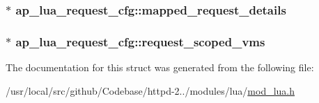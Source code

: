\subsubsection[{\texorpdfstring{mapped\+\_\+request\+\_\+details}{mapped_request_details}}]{$\ast$ ap\+\_\+lua\+\_\+request\+\_\+cfg\+::mapped\+\_\+request\+\_\+details}\hypertarget{structap__lua__request__cfg_ab57350a11763e1efce1022097c0d7c92}{}\label{structap__lua__request__cfg_ab57350a11763e1efce1022097c0d7c92}
\subsubsection[{\texorpdfstring{request\+\_\+scoped\+\_\+vms}{request_scoped_vms}}]{$\ast$ ap\+\_\+lua\+\_\+request\+\_\+cfg\+::request\+\_\+scoped\+\_\+vms}\hypertarget{structap__lua__request__cfg_a7f3a31e3eb6ae100cc29c0a53024f79e}{}\label{structap__lua__request__cfg_a7f3a31e3eb6ae100cc29c0a53024f79e}


The documentation for this struct was generated from the following file\+:\begin{DoxyCompactItemize}
\item 
/usr/local/src/github/\+Codebase/httpd-\/2../modules/lua/\hyperlink{mod__lua_8h}{mod\+\_\+lua.\+h}\end{DoxyCompactItemize}
